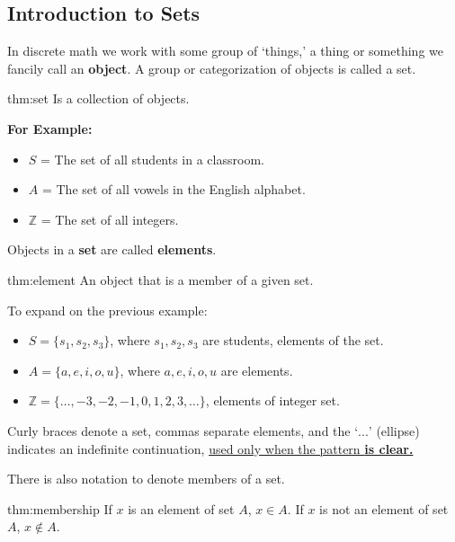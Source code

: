 \subsection{Introduction to Sets}
\hspace*{1em}
In discrete math we work with some group of `things,' a thing or something
we fancily call an \textbf{object}. A group or categorization of objects is called a set.

\begin{theo}[Set]{thm:set}
    Is a collection of objects.
\end{theo}

\noindent
\textbf{For Example:}
\begin{itemize}
    \item $S$ = The set of all students in a classroom.
    \item $A$ = The set of all vowels in the English alphabet.
    \item $\mathbb{Z}$ = The set of all integers.

\end{itemize}
Objects in a \textbf{set} are called \textbf{elements}.

\begin{theo}[Element]{thm:element}
    An object that is a member of a given set.
\end{theo}

\noindent
To expand on the previous example:
\begin{itemize}
    \item $S = \{s_1, s_2, s_3\}$, where $s_1, s_2, s_3$ are students, elements of the set.
    \item $A = \{a, e, i, o, u\}$, where $a, e, i, o, u$ are elements.
    \item $\mathbb{Z} = \{\ldots, -3, -2, -1, 0, 1, 2, 3, \ldots\}$, elements of integer set.
\end{itemize}
Curly braces denote a set, commas separate elements, and
the `$...$' (ellipse) indicates an indefinite continuation, \underline{used only when the pattern \textbf{is clear.}}\\

\newpage

\noindent
There is also notation to denote members of a set.

\begin{theo}[Membership]{thm:membership}
    If $x$ is an element of set $A$, $x \in A$.
    If $x$ is not an element of set $A$, $x \notin A$.
\end{theo}

